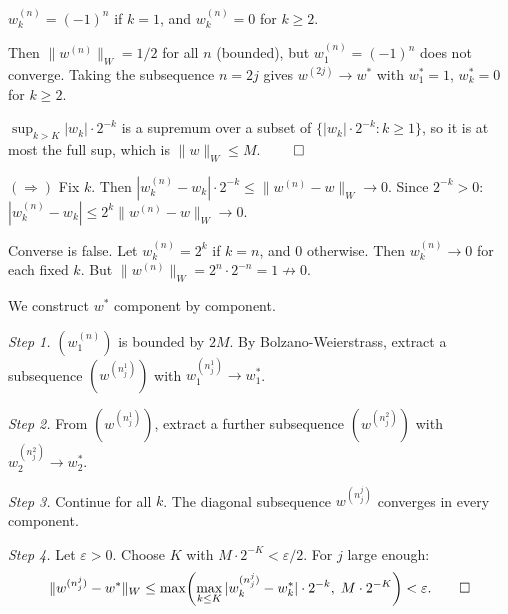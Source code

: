 \documentclass[10pt, a4paper]{article}
\newcommand{\eps}{\varepsilon}
\begin{document}
\begin{solution}[Q7]
$w^{(n)}_k = (-1)^n$ if $k = 1$, and $w^{(n)}_k = 0$ for $k \ge 2$.

Then $\|w^{(n)}\|_W = 1/2$ for all $n$ (bounded), but $w^{(n)}_1 = (-1)^n$
does not converge. Taking the subsequence $n = 2j$ gives $w^{(2j)} \to w^*$
with $w^*_1 = 1$, $w^*_k = 0$ for $k \ge 2$.
\end{solution}

\begin{solution}[Q8]
$\sup_{k > K} |w_k| \cdot 2^{-k}$ is a supremum over a subset of
$\{|w_k| \cdot 2^{-k} : k \ge 1\}$, so it is at most the full sup, which
is $\|w\|_W \le M$. $\qed$
\end{solution}

\begin{solution}[Q9]
$(\Rightarrow)$ Fix $k$. Then $|w^{(n)}_k - w_k| \cdot 2^{-k} \le
\|w^{(n)} - w\|_W \to 0$. Since $2^{-k} > 0$:
$|w^{(n)}_k - w_k| \le 2^k \|w^{(n)} - w\|_W \to 0$.

Converse is false. Let $w^{(n)}_k = 2^k$ if $k = n$, and $0$ otherwise.
Then $w^{(n)}_k \to 0$ for each fixed $k$. But
$\|w^{(n)}\|_W = 2^n \cdot 2^{-n} = 1 \not\to 0$.
\end{solution}

\begin{solution}[Q10]
We construct $w^*$ component by component.

\textit{Step 1.} $(w^{(n)}_1)$ is bounded by $2M$. By Bolzano-Weierstrass,
extract a subsequence $(w^{(n^1_j)})$ with $w^{(n^1_j)}_1 \to w^*_1$.

\textit{Step 2.} From $(w^{(n^1_j)})$, extract a further subsequence
$(w^{(n^2_j)})$ with $w^{(n^2_j)}_2 \to w^*_2$.

\textit{Step 3.} Continue for all $k$. The diagonal subsequence
$w^{(n^j_j)}$ converges in every component.

\textit{Step 4.} Let $\eps > 0$. Choose $K$ with $M \cdot 2^{-K} < \eps/2$.
For $j$ large enough:
\[
  \|w^{(n^j_j)} - w^*\|_W
  \le \max\!\left(\max_{k \le K} |w^{(n^j_j)}_k - w^*_k| \cdot 2^{-k},\;
       M \cdot 2^{-K}\right) < \eps. \qed
\]
\end{solution}
\end{document}
